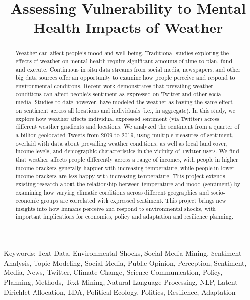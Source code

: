 \documentclass{article}
\begin{document}
\title{Assessing Vulnerability to Mental Health Impacts of Weather}



\maketitle

\begin{abstract}
Weather can affect people’s mood and well-being. Traditional studies exploring the effects of weather on mental health require significant amounts of time to plan, fund and execute.  Continuous in situ data streams from social media, newspapers, and other big data sources offer an opportunity to examine how people perceive and respond to environmental conditions. Recent work demonstrates that prevailing weather conditions can affect people’s sentiment as expressed on Twitter and other social media.  Studies to date however, have modeled the weather as having the same effect on sentiment across all locations and individuals (i.e., in aggregate).  In this study, we explore how weather affects individual expressed sentiment (via Twitter) across different weather gradients and locations. We analyzed the sentiment from a quarter of a billion geolocated Tweets from 2009 to 2019, using multiple measures of sentiment, overlaid with data about prevailing weather conditions, as well as local land cover, income levels, and demographic characteristics in the vicinity of Twitter users.  We find that weather affects people differently across a range of incomes, with people in higher income brackets generally happier with increasing temperature, while people in lower income brackets are less happy with increasing temperature.  This project extends existing research about the relationship between temperature and mood (sentiment) by examining how varying climatic conditions across different geographies and socio-economic groups are correlated with expressed sentiment. This project brings new insights into how humans perceive and respond to environmental shocks, with important implications for economics, policy and adaptation and resilience planning.

\end{abstract}

Keywords: Text Data, Environmental Shocks, Social Media Mining, Sentiment Analysis, Topic Modeling, Social Media, Public Opinion, Perception, Sentiment, Media, News, Twitter, Climate Change, Science Communication, Policy, Planning, Methods, Text Mining, Natural Language Processing, NLP, Latent Dirichlet Allocation, LDA, Political Ecology, Politics, Resilience, Adaptation
\end{document}
